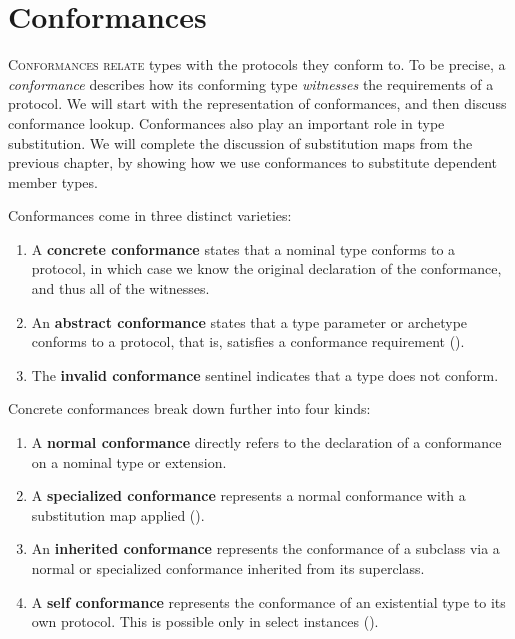 \documentclass[../generics]{subfiles}
\begin{document}
\chapter{Conformances}\label{conformances}

\lettrine{C}{onformances relate} types with the protocols they conform to. To be precise, a \emph{conformance} describes how its conforming type \emph{witnesses} the requirements of a protocol. We will start with the representation of conformances, and then discuss conformance lookup. Conformances also play an important role in type substitution. We will complete the discussion of substitution maps from the previous chapter, by showing how we use conformances to substitute dependent member types.

Conformances come in three distinct varieties:
\begin{enumerate}
\item A \textbf{concrete conformance} states that a nominal type conforms to a protocol, in which case we know the original declaration of the conformance, and thus all of the witnesses.
\item An \textbf{abstract conformance} states that a type parameter or archetype conforms to a protocol, that is, satisfies a conformance requirement ().
\item The \textbf{invalid conformance} sentinel indicates that a type does not conform.
\end{enumerate}

Concrete conformances break down further into four kinds:
\begin{enumerate}
\item A \textbf{normal conformance} directly refers to the declaration of a conformance on a nominal type or extension.
\item A \textbf{specialized conformance} represents a normal conformance with a substitution map applied ().
\item An \textbf{inherited conformance} represents the conformance of a subclass via a normal or specialized conformance inherited from its superclass.
\item A \textbf{self conformance} represents the conformance of an existential type to its own protocol. This is possible only in select instances ().
\end{enumerate}
\end{document}
